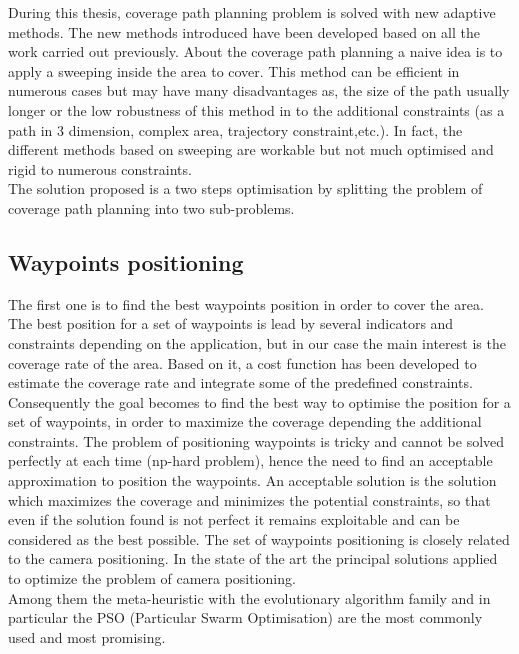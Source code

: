 During this thesis, coverage path planning problem is solved with new adaptive methods. The new methods introduced have been developed based on all the work carried out previously. 
About the coverage path planning a naive idea is to apply a sweeping inside the area to cover. This method can be efficient in numerous cases but may have many disadvantages as, the size of the path usually longer
or the low robustness of this method in  to the additional constraints (as a path in 3 dimension, complex area, trajectory constraint,etc.). In fact, the different methods based on sweeping are workable but not much optimised and rigid to numerous constraints. \\
The solution proposed is a two steps optimisation by splitting the problem of coverage path planning into two sub-problems. 
\subsection{Waypoints positioning}
The first one is to find the best waypoints position in order to cover the area. 
The best position for a set of waypoints is lead by several indicators and constraints depending on the application, but in our case the main interest is the coverage rate of the area. Based on it, a cost function has been developed to estimate the coverage rate and integrate some of the predefined constraints.\\
Consequently the goal becomes to find the best way to optimise the position for a set of waypoints, in order to maximize the coverage depending the additional constraints. The problem of positioning waypoints is tricky and cannot be solved perfectly at each time (np-hard problem), hence the need to find an acceptable approximation to position the waypoints. An acceptable solution is the solution which maximizes the coverage and minimizes the potential constraints, so that even if the solution found is not perfect it remains exploitable and can be considered as the best possible.
The set of waypoints positioning is closely related to the camera positioning. In the state of the art the principal solutions applied to optimize the problem of camera positioning.\\
Among them the meta-heuristic with the evolutionary algorithm family and in particular the PSO (Particular Swarm Optimisation) are the most commonly used and most promising.
